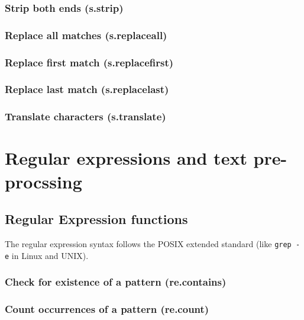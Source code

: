 \documentclass{article}
\theoremstyle{definition}
\begin{document}
\subsubsection{Strip both ends (s.strip)}

\subsubsection{Replace all matches (s.replaceall)}

\subsubsection{Replace first match (s.replacefirst)}

\subsubsection{Replace last match (s.replacelast)}

\subsubsection{Translate characters (s.translate)}

\pagebreak

\section{Regular expressions and text pre-procssing}

\subsection{Regular Expression functions}

The regular expression syntax follows the POSIX extended standard (like {\tt grep -e} in Linux and UNIX).

\subsubsection{Check for existence of a pattern (re.contains)}

\subsubsection{Count occurrences of a pattern (re.count)}
\end{document}
